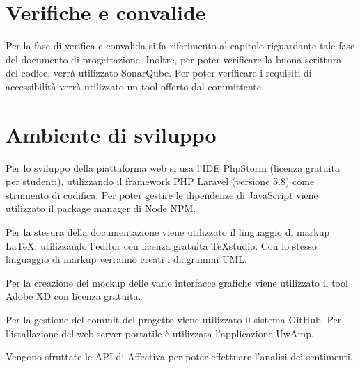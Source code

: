 \section{Verifiche e convalide}
Per la fase di verifica e convalida si fa riferimento al capitolo riguardante 
tale fase del documento di progettazione. Inoltre, per poter verificare la 
buona scrittura del codice, verrà utilizzato SonarQube. Per poter verificare i 
requisiti di accessibilità verrà utilizzato un tool offerto dal committente.

\section{Ambiente di sviluppo}
Per lo sviluppo della piattaforma web si usa l'IDE PhpStorm (licenza gratuita 
per studenti), utilizzando il framework PHP Laravel (versione 5.8) come 
strumento di codifica. Per poter gestire le dipendenze di JavaScript viene 
utilizzato il package manager di Node NPM.

Per la stesura della documentazione viene utilizzato il linguaggio di markup 
LaTeX, utilizzando l'editor con licenza gratuita TeXstudio. Con lo stesso 
linguaggio di markup verranno creati i diagrammi UML.

Per la creazione dei mockup delle varie interfacce grafiche viene utilizzato il 
tool Adobe XD con licenza gratuita. 

Per la gestione del commit del progetto viene utilizzato il sistema GitHub. Per 
l'istallazione del web server portatile è utilizzata l'applicazione UwAmp.

Vengono sfruttate le API di Affectiva per poter effettuare l'analisi dei 
sentimenti.
